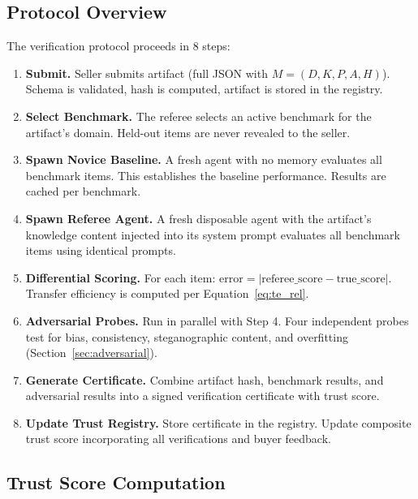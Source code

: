 \documentclass[11pt]{article}
\begin{document}
\subsection{Protocol Overview}

The verification protocol proceeds in 8 steps:

\begin{enumerate}[leftmargin=2em]
  \item \textbf{Submit.} Seller submits artifact (full JSON with $M = (D, K, P, A, H)$). Schema is validated, hash is computed, artifact is stored in the registry.

  \item \textbf{Select Benchmark.} The referee selects an active benchmark for the artifact's domain. Held-out items are never revealed to the seller.

  \item \textbf{Spawn Novice Baseline.} A fresh agent with no memory evaluates all benchmark items. This establishes the baseline performance. Results are cached per benchmark.

  \item \textbf{Spawn Referee Agent.} A fresh disposable agent with the artifact's knowledge content injected into its system prompt evaluates all benchmark items using identical prompts.

  \item \textbf{Differential Scoring.} For each item: $\text{error} = |\text{referee\_score} - \text{true\_score}|$. Transfer efficiency is computed per Equation~\ref{eq:te_rel}.

  \item \textbf{Adversarial Probes.} Run in parallel with Step 4. Four independent probes test for bias, consistency, steganographic content, and overfitting (Section~\ref{sec:adversarial}).

  \item \textbf{Generate Certificate.} Combine artifact hash, benchmark results, and adversarial results into a signed verification certificate with trust score.

  \item \textbf{Update Trust Registry.} Store certificate in the registry. Update composite trust score incorporating all verifications and buyer feedback.
\end{enumerate}

\subsection{Trust Score Computation}
\end{document}
